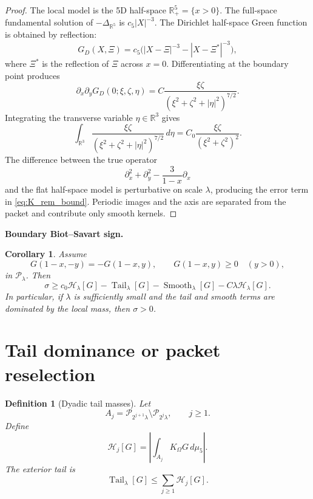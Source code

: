\documentclass[11pt]{amsart}
\newtheorem{corollary}[theorem]{Corollary}
\newtheorem{definition}[theorem]{Definition}
\newcommand{\R}{\mathbb R}
\begin{document}
\begin{proof}
The local model is the 5D half-space \(\R^5_+=\{x>0\}\).  The full-space fundamental solution of \(-\Delta_{\R^5}\) is \(c_5|X|^{-3}\).  The Dirichlet half-space Green function is obtained by reflection:
\[
G_D(X,\Xi)=c_5\bigl(|X-\Xi|^{-3}-|X-\Xi^*|^{-3}\bigr),
\]
where \(\Xi^*\) is the reflection of \(\Xi\) across \(x=0\).  Differentiating at the boundary point produces
\[
\partial_x\partial_yG_D(0;\xi,\zeta,\eta)
=
C\frac{\xi\zeta}{(\xi^2+\zeta^2+|\eta|^2)^{7/2}}.
\]
Integrating the transverse variable \(\eta\in\R^3\) gives
\[
\int_{\R^3}
\frac{\xi\zeta}{(\xi^2+\zeta^2+|\eta|^2)^{7/2}}\,d\eta
=
C_0\frac{\xi\zeta}{(\xi^2+\zeta^2)^2}.
\]
The difference between the true operator
\[
\partial_x^2+\partial_y^2-\frac3{1-x}\partial_x
\]
and the flat half-space model is perturbative on scale \(\lambda\), producing the error term in \eqref{eq:K_rem_bound}.  Periodic images and the axis are separated from the packet and contribute only smooth kernels.
\end{proof}

\medskip
\noindent\textbf{Boundary Biot--Savart sign.}
\begin{corollary}\label{cor:BS_sign}
Assume
\[
G(1-x,-y)=-G(1-x,y),
\qquad
G(1-x,y)\ge0\quad(y>0),
\]
in \(\mathcal P_\lambda\).  Then
\begin{equation}\label{eq:BS_sign}
\sigma
\ge
c_0\mathcal H_\lambda[G]
-
\operatorname{Tail}_\lambda[G]
-
\operatorname{Smooth}_\lambda[G]
-
C\lambda\mathcal H_\lambda[G].
\end{equation}
In particular, if \(\lambda\) is sufficiently small and the tail and smooth terms are dominated by the local mass, then \(\sigma>0\).
\end{corollary}

\section{Tail dominance or packet reselection}

\begin{definition}[Dyadic tail masses]\label{def:tail_masses}
Let
\[
A_j=\mathcal P_{2^{j+1}\lambda}\setminus \mathcal P_{2^j\lambda},
\qquad j\ge1.
\]
Define
\[
\mathcal H_j[G]
=
\left|\int_{A_j}K_\Omega G\,d\mu_5\right|.
\]
The exterior tail is
\[
\operatorname{Tail}_\lambda[G]
\le
\sum_{j\ge1}\mathcal H_j[G].
\]
\end{definition}
\end{document}
